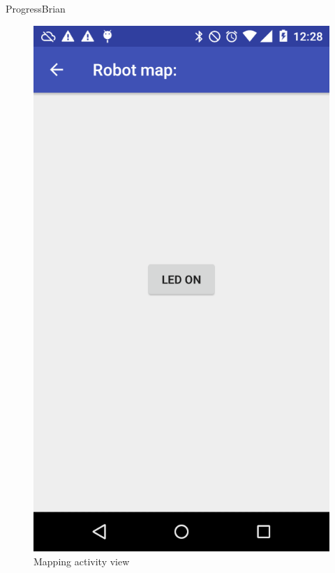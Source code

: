 \documentclass{beamer}
\begin{document}
\begin{frame}{Progress}{Brian}
    \begin{figure}
        \centering
        \includegraphics[scale=0.17]{figs/img/mapViewMappingApp7-8-20[1].png}
        \caption{Mapping activity view}
        \label{fig:mapping_activity_img}
    \end{figure}
\end{frame}
\end{document}
